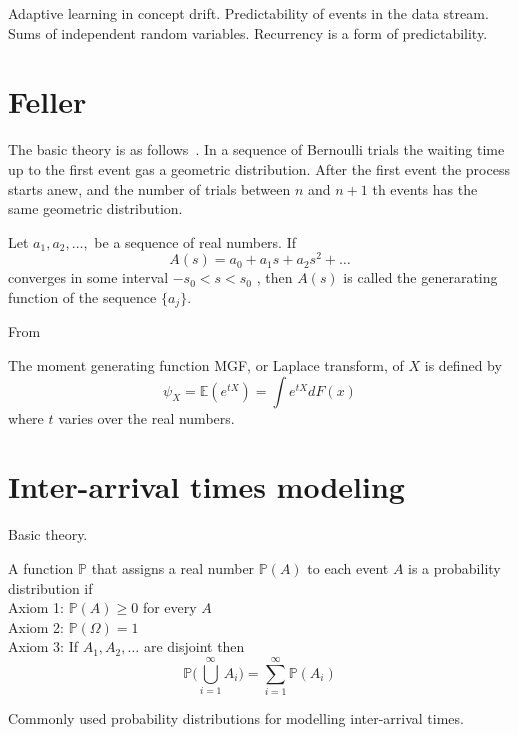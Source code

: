 \documentclass[doctoral,utf8,lot,loar,lof,shortloft,index]{jydiss}
\begin{document}
Adaptive learning in concept drift.
Predictability of events in the data stream.
~\cite{feller2008introduction}
Sums of independent random variables.
Recurrency is a form of predictability.

\section{Feller}
The basic theory is as follows~\cite{feller2008introduction}.
In a sequence of Bernoulli trials the waiting time up to the first event gas a geometric distribution.
After the first event the process starts anew, and the number of trials between $n$ and $n+1$ th events has the same geometric distribution.
\begin{definition}
	Let $a_1, a_2, \dots, $ be a sequence of real numbers. If 
	\begin{equation}
		A(s) = a_0 + a_1 s + a_2 s^2 + \dots 
	\end{equation}
    converges in some interval $-s_0 < s < s_0 $ , then $A(s)$ is called the generarating function of the sequence $\{a_j\}$. 
\end{definition}

From\cite{wasserman2013all}
\begin{definition}
	The moment generating function MGF, or Laplace transform, of $X$ is defined by
	\begin{equation}
		\psi_X = \mathbb{E}(e^{tX}) = \int e^{tX} dF(x) 
	\end{equation}
where $t$ varies over the real numbers.
\end{definition}

\section{Inter-arrival times modeling}
Basic theory.
\begin{definition}
	A function $\mathbb{P}$ that assigns a real number $\mathbb{P}(A)$ to each event $A$ is a probability distribution if \\
	Axiom 1: $\mathbb{P}(A) \geq 0$ for every $A$\\
	Axiom 2: $\mathbb{P}(\Omega) = 1$\\
	Axiom 3: If $A_1, A_2, \dots $ are disjoint then 
	\begin{equation}
		\mathbb{P} \Big( \bigcup\limits_{i=1}^{\infty} A_i  \Big) = \sum_{i=1}^{\infty} \mathbb{P}(A_i)
	\end{equation}
\end{definition}
Commonly used probability distributions for modelling inter-arrival times.
\end{document}
